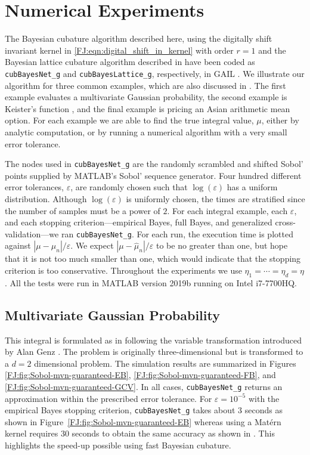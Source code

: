 \documentclass[graybox,footinfo]{svmult}
\newcommand{\abs}[1]{\left\lvert #1 \right\rvert} %
\begin{document}
\section{Numerical Experiments}

\label{FJ:sec:NumExp}


The Bayesian cubature algorithm described here, using the digitally shift invariant kernel in \eqref{FJ:eqn:digital_shift_in_kernel} with order $r=1$  and the Bayesian lattice cubature algorithm described in \cite{RatHic19a} have been coded as  \texttt{cubBayesNet\_g} and \texttt{cubBayesLattice\_g}, respectively, in GAIL \cite{ChoEtal21a}.  We illustrate our algorithm for three common examples, which are also discussed in \cite{RatHic19a}.  The first example evaluates a multivariate Gaussian probability, the second example is Keister's function \cite{Kei96}, and the final example is pricing an Asian arithmetic mean option.  For each example we are able to find the true integral value, $\mu$, either by analytic computation, or by running a numerical algorithm with a very small error tolerance.

The nodes used in \texttt{cubBayesNet\_g} are the randomly scrambled and shifted Sobol' points supplied by MATLAB's Sobol' sequence generator. Four hundred different error tolerances, $\varepsilon$, are randomly chosen such that $\log(\varepsilon)$ has a uniform distribution.   Although $\log(\varepsilon)$ is uniformly chosen, the times are stratified since the number of samples must be a power of $2$.
For each integral example, each $\varepsilon$, and each stopping criterion---empirical Bayes, full Bayes, and generalized cross-validation---we ran \texttt{cubBayesNet\_g}.  For each run, the execution time is plotted against $\abs{\mu - \widehat{\mu}_n}/\varepsilon$.  We expect $\abs{\mu - \widehat{\mu}_n}/\varepsilon$ to be no greater than one, but hope that it is not too much smaller than one, which would indicate that the stopping criterion  is too conservative. Throughout the experiments we use $\eta_1 = \cdots = \eta_d = \eta$.
All the tests were run in MATLAB version 2019b running on Intel i7-7700HQ.

\subsection{Multivariate Gaussian Probability}

This integral is formulated as in \cite{RatHic19a} following the variable transformation introduced by Alan Genz \cite{Gen92}. The problem is originally three-dimensional but is transformed to a $d=2$ dimensional problem.  The simulation results are summarized in Figures \ref{FJ:fig:Sobol-mvn-guaranteed-EB}, \ref{FJ:fig:Sobol-mvn-guaranteed-FB}, and \ref{FJ:fig:Sobol-mvn-guaranteed-GCV}.  In all cases, \texttt{cubBayesNet\_g} returns an approximation within the prescribed error tolerance. For  $\varepsilon=10^{-5}$ with the empirical Bayes stopping criterion, \texttt{cubBayesNet\_g} takes about 3 seconds as shown in Figure~\ref{FJ:fig:Sobol-mvn-guaranteed-EB} whereas using a Mat\'ern kernel requires 30 seconds to obtain the same accuracy as shown in \cite{RatHic19a}. This highlights the speed-up possible using fast Bayesian cubature.
\end{document}
